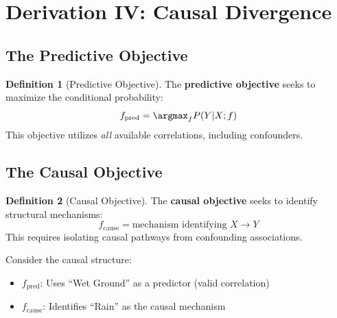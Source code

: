 \documentclass[11pt,a4paper]{article}
\theoremstyle{definition}
\newtheorem{definition}{Definition}[section]
\begin{document}
\section{Derivation IV: Causal Divergence}
\label{sec:causal}

\subsection{The Predictive Objective}

\begin{definition}[Predictive Objective]
The \textbf{predictive objective} seeks to maximize the conditional probability:
\begin{equation}
f_{\text{pred}} = \argmax_f P(Y | X; f)
\end{equation}
This objective utilizes \textit{all} available correlations, including confounders.
\end{definition}

\subsection{The Causal Objective}

\begin{definition}[Causal Objective]
The \textbf{causal objective} seeks to identify structural mechanisms:
\begin{equation}
f_{\text{cause}} = \text{mechanism identifying } X \to Y
\end{equation}
This requires isolating causal pathways from confounding associations.
\end{definition}

\begin{example}
Consider the causal structure:
\begin{center}
\end{center}

\begin{itemize}    \item $f_{\text{pred}}$: Uses ``Wet Ground'' as a predictor (valid correlation)
    \item $f_{\text{cause}}$: Identifies ``Rain'' as the causal mechanism
\end{itemize}
\end{example}
\end{document}
